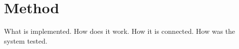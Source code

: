 
\chapter{Method}
What is implemented. How does it work. How it is connected. How was the system tested.
\cleardoublepage